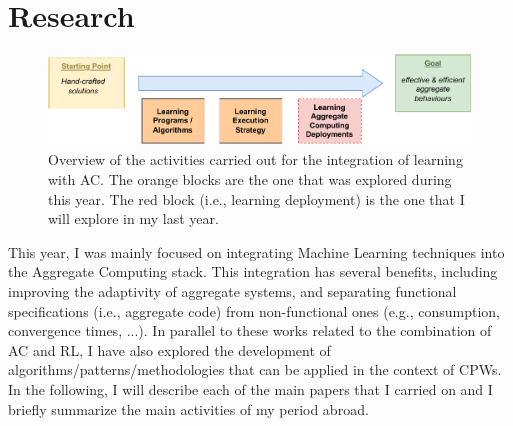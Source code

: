 \documentclass[11pt]{article}
\begin{document}
\section{Research}
\begin{figure}
	\includegraphics[width=\textwidth]{roadmap.pdf}
	\caption{
		Overview of the activities carried out for the integration of learning with AC. 
		The orange blocks are the one that was explored during this year. 
		The red block (i.e., learning deployment) is the one that I will explore in my last year.
	}
	\label{fig:overview}
\end{figure}
This year, 
 I was mainly focused on integrating Machine Learning techniques into the Aggregate Computing stack.
%
This integration has several benefits, 
 including improving the adaptivity of aggregate systems, 
 and separating functional specifications (i.e., aggregate code) from non-functional ones (e.g., consumption, convergence times, ...).
%
In parallel to these works related to the combination of AC and RL, 
 I have also explored the development of algorithms/patterns/methodologies 
 that can be applied in the context of CPWs.
In the following, I will describe each of the main papers that I carried on
 and I briefly summarize the main activities of my period abroad.
\end{document}
